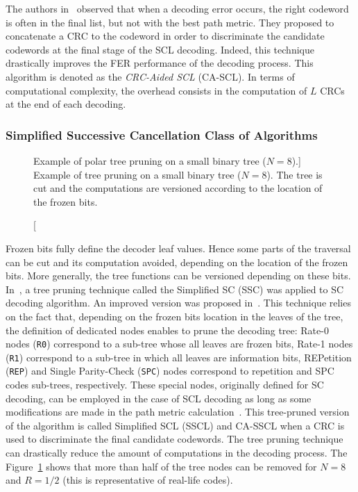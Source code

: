 The authors in~\cite{Tal2011} observed that when a decoding error occurs, the
right codeword is often in the final list, but not with the best path metric.
They proposed to concatenate a CRC to the codeword in order to discriminate the
candidate codewords at the final stage of the SCL decoding. Indeed, this
technique drastically improves the FER performance of the decoding process. This
algorithm is denoted as the \emph{CRC-Aided SCL} (CA-SCL). In terms of
computational complexity, the overhead consists in the computation of $L$ CRCs
at the end of each decoding.

\subsubsection{Simplified Successive Cancellation Class of Algorithms}
\label{sec:ctx_polar_simplified_decoders}

\begin{figure}[htp]
  \centering
  \caption
    [Example of polar tree pruning on a small binary tree ($N = 8$).]
    {Example of tree pruning on a small binary tree ($N = 8$). The tree is cut
    and the computations are versioned according to the location of the frozen
    bits.}
  \label{fig:ctx_polar_tree_pruning_example}
\end{figure}

Frozen bits fully define the decoder leaf values. Hence some parts of the
traversal can be cut and its computation avoided, depending on the location of
the frozen bits. More generally, the tree functions can be versioned depending
on these bits. In~\cite{Alamdar-Yazdi2011}, a tree pruning technique called the
Simplified SC (SSC) was applied to SC decoding algorithm. An improved version
was proposed in~\cite{Sarkis2014a}. This technique relies on the fact that,
depending on the frozen bits location in the leaves of the tree, the definition
of dedicated nodes enables to prune the decoding tree: Rate-0 nodes (\verb|R0|)
correspond to a sub-tree whose all leaves are frozen bits, Rate-1 nodes
(\verb|R1|) correspond to a sub-tree in which all leaves are information bits,
REPetition (\verb|REP|) and Single Parity-Check (\verb|SPC|) nodes correspond to
repetition and SPC codes sub-trees, respectively. These special nodes,
originally defined for SC decoding, can be employed in the case of SCL decoding
as long as some modifications are made in the path metric
calculation~\cite{Sarkis2016}. This tree-pruned version of the algorithm is
called Simplified SCL (SSCL) and CA-SSCL when a CRC is used to discriminate
the final candidate codewords. The tree pruning technique can drastically reduce
the amount of computations in the decoding process. The
Figure~\ref{fig:ctx_polar_tree_pruning_example} shows that more than half of the
tree nodes can be removed for $N = 8$ and $R = 1 / 2$ (this is representative of
real-life codes).


